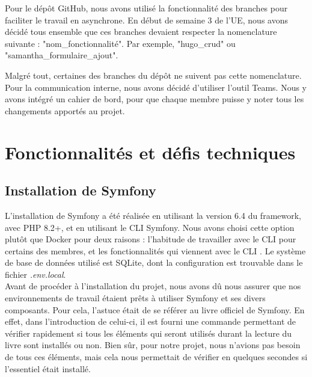 \documentclass[12pt,a4paper]{article}
\begin{document}
	Pour le dépôt GitHub, nous avons utilisé la fonctionnalité des branches pour faciliter le travail en asynchrone. 
En début de semaine 3 de l'UE, nous avons décidé tous ensemble que ces branches devaient respecter la nomenclature suivante : "nom\_fonctionnalité". Par exemple, "hugo\_crud" ou "samantha\_formulaire\_ajout". 

Malgré tout, certaines des branches du dépôt ne suivent pas cette nomenclature. \\
	
	Pour la communication interne, nous avons décidé d'utiliser l'outil Teams. Nous y avons intégré un cahier de bord, pour que chaque membre puisse y noter tous les changements apportés au projet.
	

\section{Fonctionnalités et défis techniques}

	
		\subsection{Installation de Symfony}
		
		L'installation de Symfony a été réalisée en utilisant la version 6.4 \cite{symfony} du framework, avec PHP 8.2+, et en utilisant le CLI Symfony. Nous avons choisi cette option plutôt que Docker pour deux raisons : l'habitude de travailler avec le CLI pour certains des membres, et les fonctionnalités qui viennent avec le CLI \cite{symfony-cli}. 
		Le système de base de données utilisé est SQLite, dont la configuration est trouvable dans le fichier \textit{.env.local}. \\
		
Avant de procéder à l'installation du projet, nous avons dû nous assurer que nos environnements de travail étaient prêts à utiliser Symfony et ses divers composants. 
Pour cela, l'astuce était de se référer au livre officiel \cite{environnement} de Symfony. 
En effet, dans l'introduction de celui-ci, il est fourni une commande permettant de vérifier rapidement si tous les éléments qui seront utilisés durant la lecture du livre sont installés ou non. 
Bien sûr, pour notre projet, nous n'avions pas besoin de tous ces éléments, mais cela nous permettait de vérifier en quelques secondes si l'essentiel était installé.
		
\end{document}
